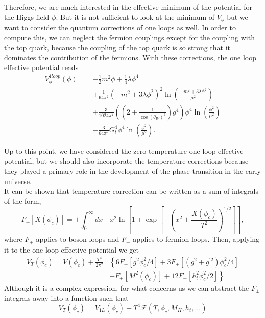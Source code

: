 \documentclass{article}
\numberwithin{equation}{section}
\begin{document}
Therefore, we are much interested in the effective minimum of the potential for the Higgs field $\phi$. But it is not sufficient to look at the minimum of $V_{\phi}$ but we want to consider the quantum corrections of one loops as well. In order to compute this, we can neglect the fermion couplings except for the coupling with the top quark, because the coupling of the top quark is so strong that it dominates the contribution of the fermions. 
With these corrections, the one loop effective potential reads
\begin{align*}
    V_{\phi}^{1loop}(\phi) =& -\frac{1}{2}m^2\phi + \frac{1}{4}\lambda\phi^4\\
    & +\frac{1}{64\pi^2}(-m^2 +3\lambda\phi^2)^2\ln\left(\frac{-m^2+3\lambda\phi^2}{\mu^2}\right)\\
    &+\frac{3}{1024 \pi^2}((2 + \frac{1}{\cos(\theta_W)^4})g^4)\phi^4 \ln\left(\frac{\phi^2}{\mu^2}\right)\\
    &-\frac{3}{64 \pi^2}G_t^4 \phi^4 \ln\left(\frac{\phi^2}{\mu^2}\right). 
\end{align*}

Up to this point, we have considered the zero temperature one-loop effective potential, but we should also incorporate the temperature corrections because they played a primary role in the development of the phase transition in the early universe.
\\
It can be shown that temperature correction can be written as a sum of integrals of the form,
\begin{equation}
F_{\pm}\left[X\left(\phi_{c}\right)\right] = \pm \int_{0}^{\infty} d x \quad x^{2} \ln \left[1 \mp \exp \left[-\left(x^{2}+\frac{X\left(\phi_{c}\right)}{ T^{2}}\right)^{1 / 2}\right]\right],
\end{equation}
where $F_+$ applies to boson loops and $F_-$ applies to fermion loops. Then, applying it to the one-loop effective potential we get
\begin{align*}
V_{T}\left(\phi_{c}\right)=V\left(\phi_{c}\right)+\frac{T^{4}}{2 \pi^{2}}&\left\{6 F_{+}\left[g^{2} \phi_{c}^{2} / 4\right]+3 F_{+}\left[\left(g^{2}+g^{\prime 2}\right) \phi_{c}^{2} / 4\right]\right. \\
&\left.+F_{+}\left[M^{2}\left(\phi_{c}\right)\right]+12 F_{-}\left[h_{t}^{2} \phi_{c}^{2} / 2\right]\right\}
\end{align*}
Although it is a complex expression, for what concerns us we can abstract the $F_{\pm}$ integrals away into a function such that
\begin{equation}
V_{T}\left(\phi_{c}\right)=V_{1 L}\left(\phi_{c}\right)+T^{4} \mathcal{F}\left(T, \phi_{c}, M_{H}, h_{t}, \ldots\right)
\end{equation}
\end{document}
